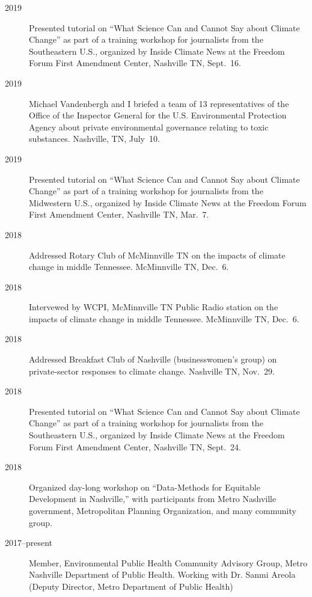 \documentclass[10pt]{article}
\begin{document}
        \begin{description}
            \item[2019] Presented tutorial on ``What Science Can and Cannot Say about Climate Change'' as part of a training workshop for journalists from the Southeastern U.S., organized by Inside Climate News at the Freedom Forum First Amendment Center, Nashville TN, Sept.~16.
            \item[2019] Michael Vandenbergh and I briefed a team of 13 representatives of the Office of the Inspector General for the U.S. Environmental Protection Agency about private environmental governance relating to toxic substances. Nashville, TN, July~10.
            \item[2019] Presented tutorial on ``What Science Can and Cannot Say about Climate Change'' as part of a training workshop for journalists from the Midwestern U.S., organized by Inside Climate News at the Freedom Forum First Amendment Center, Nashville TN, Mar.~7.
            \item[2018] Addressed Rotary Club of McMinnville TN on the impacts of climate change in middle Tennessee. McMinnville TN, Dec.\ 6.
            \item[2018] Intervewed by WCPI, McMinnville TN Public Radio station on the impacts of climate change in middle Tennessee. McMinnville TN, Dec.\ 6.
            \item[2018] Addressed Breakfast Club of Nashville (businesswomen's group) on private-sector responses to climate change. Nashville TN, Nov.\ 29.
            \item[2018] Presented tutorial on ``What Science Can and Cannot Say about Climate Change'' as part of a training workshop for journalists from the Southeastern U.S., organized by Inside Climate News at the Freedom Forum First Amendment Center, Nashville TN, Sept.~24.
            \item[2018] Organized day-long workshop on ``Data-Methods for Equitable Development in Nashville,'' with participants from Metro Nashville government, Metropolitan Planning Organization,
            and many community group.
            \item[2017--present] Member, Environmental Public Health Community Advisory Group, Metro Nashville Department of Public Health. Working with Dr. Sanmi Areola (Deputy Director, Metro Department of Public Health)

\end{description}
\end{document}
